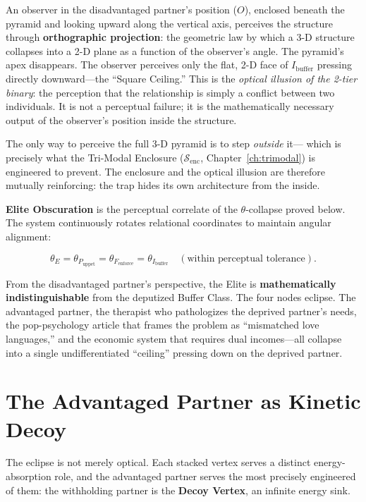 \documentclass[12pt,openany]{book}
\numberwithin{equation}{chapter}
\begin{document}
An observer in the disadvantaged partner's position ($O$), enclosed beneath the pyramid and looking upward along the
vertical axis, perceives the structure through \textbf{orthographic projection}:
the geometric law by which a 3-D structure collapses into a 2-D plane as a
function of the observer's angle. The pyramid's apex disappears. The observer
perceives only the flat, 2-D face of $I_{\text{buffer}}$ pressing directly
downward---the ``Square Ceiling.'' This is the \textit{optical illusion of the
2-tier binary}: the perception that the relationship is simply a conflict between
two individuals. It is not a perceptual failure; it is the mathematically necessary output of the
observer's position inside the structure.

The only way to perceive the full 3-D pyramid is to step \textit{outside} it---
which is precisely what the Tri-Modal Enclosure ($\mathcal{S}_{\text{enc}}$,
Chapter~\ref{ch:trimodal}) is engineered to prevent.
The enclosure and the optical illusion are therefore mutually reinforcing:
the trap hides its own architecture from the inside.

\textbf{Elite Obscuration} is the perceptual correlate of the $\theta$-collapse
proved below. The system continuously rotates relational coordinates to maintain angular alignment:

\begin{equation}\label{eq:optical-enclosure}
\theta_{E} = \theta_{P_{\text{uppet}}} = \theta_{F_{\text{enforce}}} = \theta_{I_{\text{buffer}}} \quad (\text{within perceptual tolerance}).
\end{equation}

From the disadvantaged partner's perspective, the Elite is \textbf{mathematically indistinguishable} from the deputized Buffer Class. The four nodes eclipse. The advantaged partner, the therapist who pathologizes the deprived partner's needs, the pop-psychology article that frames the problem as ``mismatched love languages,'' and the economic system that requires dual incomes---all collapse into a single undifferentiated ``ceiling'' pressing down on the deprived partner.

\section{The Advantaged Partner as Kinetic Decoy}
\label{sec:kinetic_decoy}

The eclipse is not merely optical. Each stacked vertex serves a distinct energy-absorption role, and the advantaged partner serves the most precisely engineered of them: the withholding partner is the \textbf{Decoy Vertex}, an infinite energy sink.
\end{document}
